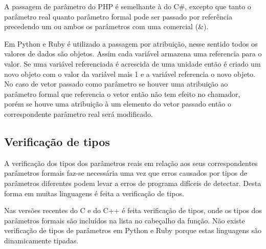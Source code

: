 A passagem de parâmetro do PHP é semelhante à do C\#, excepto que tanto o parâmetro real quanto parâmetro formal pode ser passado por referência precedendo um ou ambos os parâmetros com uma comercial (\&).

Em Python e Ruby é utilizado a passagem por atribuição, nesse sentido todos os valores de dados são objetos. Assim cada variável armazena uma referencia para o valor. Se uma variável referenciada é acrescida de uma unidade então é criado um novo objeto com o valor da variável mais 1 e a variável referencia o novo objeto. No caso de vetor passado como parâmetro se houver uma atribuição ao parâmetro formal que referencia o vetor então não tem efeito no chamador, porém se houve uma atribuição à um elemento do vetor passado então o correspondente parâmetro real será modificado.

\subsection{Verificação de tipos}
\label{sub:verificacao_de_tipos}
A verificação dos tipos dos parâmetros reais em relação aos seus correspondentes parâmetros formais faz-se necessária uma vez que erros causados por tipos de parâmetros diferentes podem levar a erros de programa difíceis de detectar. Desta forma em muitas linguagens é feita a verificação de tipos.

Nas versões recentes do C e do C++ é feita verificação de tipos, onde os tipos dos parâmetros formais são incluídos na lista no cabeçalho da função. Não existe verificação de tipos de parâmetros em Python e Ruby porque estas linguagens são dinamicamente tipadas.




